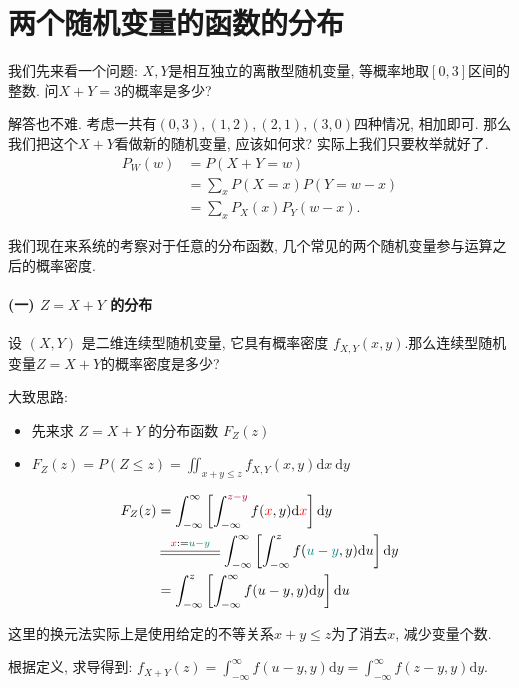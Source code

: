 \section{两个随机变量的函数的分布}

我们先来看一个问题: $X,Y$是相互独立的离散型随机变量, 等概率地取$[0,3]$区间的整数. 问$X+Y=3$的概率是多少? 

解答也不难. 考虑一共有$(0, 3), (1, 2), (2, 1), (3, 0)$四种情况, 相加即可. 那么我们把这个$X+Y$看做新的随机变量, 应该如何求? 实际上我们只要枚举就好了.
$$
\begin{aligned}
P_W(w) & =P(X+Y=w) \\
& =\sum_x P(X=x)  P(Y=w-x) \\
& =\sum_x P_X(x) P_Y(w-x) . 
\end{aligned}
$$

我们现在来系统的考察对于任意的分布函数, 几个常见的两个随机变量参与运算之后的概率密度. 

\paragraph{(一) $Z=X+Y$ 的分布}

设 $(X, Y)$ 是二维连续型随机变量, 它具有概率密度 $f_{X,Y}(x, y)$.那么连续型随机变量$Z=X+Y$的概率密度是多少?

大致思路: 
    \begin{itemize}
        \item 先来求 $Z=X+Y$ 的分布函数 $F_Z(z)$
        \item $F_Z(z)=P(Z \leq z)=\iint_{x+y \leq z} f_{X,Y}(x, y) \mathrm{d} x \mathrm{~d} y$
    \end{itemize}
    $$\begin{aligned}
        F_Z(z)&=\int_{-\infty}^{\infty}\left[\int_{-\infty}^{\purple {z-y}} f({\red{x}}, y) \mathrm{d} {\red{x}}\right] \mathrm{d} y \\ 
        &\stackrel{{\red x}:=\teal{u-y}}{\stackrel{\rule{1.5cm}{0.4pt}}{\rule{1.5cm}{0.4pt}}}
        \int_{-\infty}^{\infty}\left[\int_{-\infty}^z f({\teal {u-y}}, y) \mathrm{d} u\right] \mathrm{d} y\\
        &=\int_{-\infty}^z\left[\int_{-\infty}^{\infty} f(u-y, y) \mathrm{d} y\right] \mathrm{d} u
    \end{aligned}$$

    这里的换元法实际上是使用给定的不等关系$x+y\leq z$为了消去$x$, 减少变量个数. 

    根据定义, 求导得到: 
    $f_{X+Y}(z)=\int_{-\infty}^{\infty} f(u-y, y) \mathrm{d} y=\int_{-\infty}^{\infty} f(z-y, y) \mathrm{d} y.$

